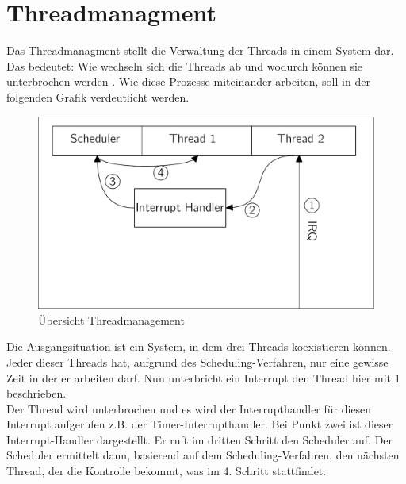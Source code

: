 \section{Threadmanagment}
Das Threadmanagment stellt die Verwaltung der Threads in einem System dar. Das bedeutet: Wie wechseln sich die Threads ab und wodurch k\"onnen sie unterbrochen werden . Wie diese Prozesse miteinander arbeiten, soll in der folgenden Grafik verdeutlicht werden.
\begin{figure}[H]
	\begin{center}	
	\caption{\"Ubersicht Threadmanagement}
	\includegraphics[scale=0.60]{common/draftconcrete-thread-managment.pdf}
	\end{center}
\end{figure}\noindent
Die Ausgangsituation ist ein System, in dem drei Threads koexistieren k\"onnen. Jeder dieser Threads hat, aufgrund des Scheduling-Verfahren, nur eine gewisse Zeit in der er arbeiten darf. Nun unterbricht ein Interrupt den Thread \textendash hier mit 1 beschrieben. \\
Der Thread wird unterbrochen und es wird der Interrupthandler f\"ur diesen Interrupt aufgerufen \textendash  z.B. der Timer-Interrupthandler. Bei Punkt zwei ist dieser Interrupt-Handler dargestellt. Er ruft im dritten Schritt den Scheduler auf. Der Scheduler ermittelt dann, basierend auf dem Scheduling-Verfahren, den n\"achsten Thread, der die Kontrolle bekommt, was im 4. Schritt stattfindet. 
